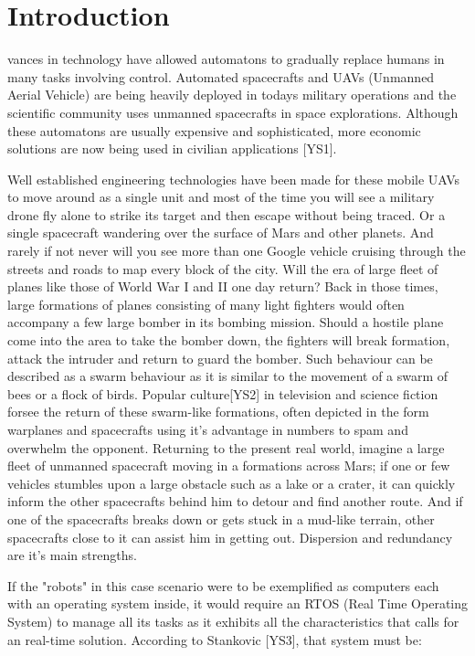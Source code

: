 \documentclass[journal]{IEEEtran}
\begin{document}
\section{Introduction}
vances in technology have allowed automatons to gradually replace humans in many tasks involving control. Automated spacecrafts and UAVs (Unmanned Aerial Vehicle) are being heavily deployed in todays military operations and the scientific
community uses unmanned spacecrafts in space explorations. Although these automatons are usually expensive and sophisticated, more economic solutions are now being used in civilian applications [YS1].

Well established engineering technologies have been made for these mobile UAVs to move around as a single unit and most of the time you will see a military drone fly alone to strike its target and then escape without being traced.
Or a single spacecraft wandering over the surface of Mars and other planets. And rarely if not never will you see more than one Google vehicle cruising through the streets and roads to map every block of the city. Will the era of large fleet of planes like those of World War I and II one day return? Back in those times, large formations of planes consisting of many light fighters would often accompany a few large bomber in its bombing mission. Should a hostile plane come into the area to take the bomber down, the fighters will break formation, attack the intruder and return to guard the bomber. Such behaviour can be described as a swarm behaviour as it is similar to the movement of a swarm of bees or a flock of birds. Popular culture[YS2] in television and science fiction forsee the return of these swarm-like formations, often depicted in the form warplanes and spacecrafts using it's advantage in numbers to spam and overwhelm the opponent. Returning to the present real world, imagine a large fleet of unmanned spacecraft moving in a formations across Mars; if one or few vehicles stumbles upon a large obstacle such as a lake or a crater, it can quickly inform the other spacecrafts behind him to detour and find another route. And if one of the spacecrafts breaks down or gets stuck in a mud-like terrain, other spacecrafts close to it can assist him in getting out. Dispersion and redundancy are it's main strengths. 

If the "robots" in this case scenario were to be exemplified as computers each with an operating system inside, it would require an RTOS (Real Time Operating System) to manage all its tasks as it exhibits all the characteristics that calls for an real-time solution. According to Stankovic [YS3], that system must be:
\end{document}
